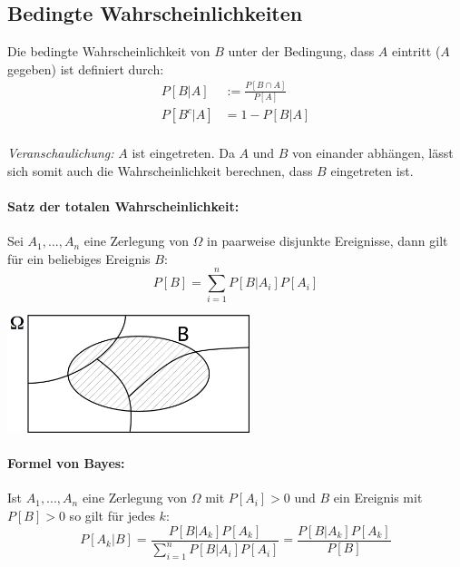 \documentclass[11pt]{article}
\begin{document}
\subsection{Bedingte Wahrscheinlichkeiten}

Die bedingte Wahrscheinlichkeit von $B$ unter der Bedingung, dass $A$ eintritt ($A$ gegeben) ist definiert durch:
\begin{equation*}
\begin{split}
	P[B|A] & := \frac{P[B \cap A]}{P[A]} \\
	P[B^c|A] & = 1-P[B|A] \\
\end{split}
\end{equation*}

\emph{Veranschaulichung:} $A$ ist eingetreten. Da $A$ und $B$ von einander abh{\"a}ngen, l{\"a}sst sich somit auch die Wahrscheinlichkeit berechnen, dass $B$ eingetreten ist.

\paragraph{Satz der totalen Wahrscheinlichkeit:} Sei $A_1,...,A_n$ eine Zerlegung von $\Omega$ in paarweise disjunkte Ereignisse, dann gilt f{\"u}r ein beliebiges Ereignis $B$:
\begin{equation*}
	P[B] = \sum_{i=1}^n P[B|A_i] P[A_i]
\end{equation*}
\begin{center}
	\includegraphics[width=200pt]{images/totale_wahrscheinlichkeit}
\end{center}

\paragraph{Formel von Bayes:} Ist $A_1,...,A_n$ eine Zerlegung von $\Omega$ mit $P[A_i] > 0$ und $B$ ein Ereignis mit $P[B] > 0$ so gilt f{\"u}r jedes $k$:
\begin{equation*}
	P[A_k|B] = \frac{P[B|A_k]P[A_k]}{\sum_{i=1}^n P[B|A_i]P[A_i]} = \frac{P[B|A_k]P[A_k]}{P[B]}
\end{equation*}
\end{document}
